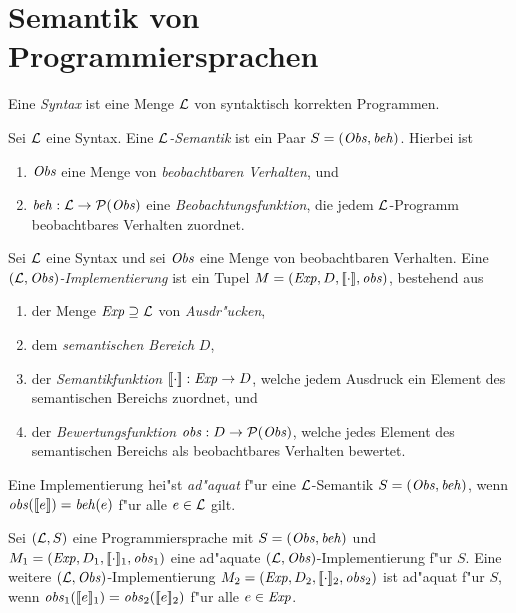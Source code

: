 \documentclass[12pt,a4paper]{article}
\begin{document}
\section{Semantik von Programmiersprachen}

\begin{definition}[Syntax]
  Eine \emph{Syntax} ist eine Menge $\mathcal L$ von syntaktisch korrekten Programmen.
\end{definition}

\begin{definition}[Semantik]
  Sei $\mathcal L$ eine Syntax. Eine \emph{$\mathcal L$-Semantik} ist ein Paar $S = (\mathit{Obs},\mathit{beh})$.
  Hierbei ist
  \begin{enumerate}
  \item $\mathit{Obs}$ eine Menge von \emph{beobachtbaren Verhalten}, und
  \item $\mathit{beh}: \mathcal L \to \mathcal{P}(\mathit{Obs})$ eine \emph{Beobachtungsfunktion}, die jedem $\mathcal L$-Programm
    beobachtbares Verhalten zuordnet.
  \end{enumerate}
\end{definition}

\begin{definition}[Implementierung]
  Sei $\mathcal L$ eine Syntax und sei $\mathit{Obs}$ eine Menge von beobachtbaren Verhalten.
  Eine \emph{$(\mathcal L,\mathit{Obs})$-Implementierung} ist ein Tupel $M = (\mathit{Exp},D,[\![\cdot]\!],\mathit{obs})$,
  bestehend aus
  \begin{enumerate}
  \item der Menge $\mathit{Exp} \supseteq \mathcal L$ von \emph{Ausdr"ucken},
  \item dem \emph{semantischen Bereich} $D$,
  \item der \emph{Semantikfunktion} $[\![\cdot]\!]:\mathit{Exp} \to D$, welche jedem Ausdruck
    ein Element des semantischen Bereichs zuordnet, und
  \item der \emph{Bewertungsfunktion} $\mathit{obs}:D \to \mathcal{P}(\mathit{Obs})$, welche jedes Element
    des semantischen Bereichs als beobachtbares Verhalten bewertet.
  \end{enumerate}
  Eine Implementierung hei"st \emph{ad"aquat} f"ur eine $\mathcal L$-Semantik $S=(\mathit{Obs},\mathit{beh})$,
  wenn $\mathit{obs}([\![e]\!]) = \mathit{beh}(e)$ f"ur alle $e \in \mathcal L$ gilt.
\end{definition}

\begin{lemma}
  Sei $(\mathcal L,S)$ eine Programmiersprache mit $S = (\mathit{Obs},\mathit{beh})$ und $M_1 = (\mathit{Exp},D_1,[\![\cdot]\!]_1,\mathit{obs}_1)$
  eine ad"aquate $(\mathcal L,\mathit{Obs})$-Implementierung f"ur $S$.
  Eine weitere $(\mathcal L,\mathit{Obs})$-Implementierung $M_2=(\mathit{Exp},D_2,[\![\cdot]\!]_2,\mathit{obs}_2)$
  ist ad"aquat f"ur $S$, wenn $\mathit{obs}_1([\![e]\!]_1) = \mathit{obs}_2([\![e]\!]_2)$ f"ur alle $e \in \mathit{Exp}$.
\end{lemma}
\end{document}

